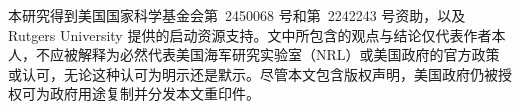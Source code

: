 
\begin{acknowledgements}
本研究得到美国国家科学基金会第~2450068 号和第~2242243 号资助，以及 Rutgers University 提供的启动资源支持。文中所包含的观点与结论仅代表作者本人，不应被解释为必然代表美国海军研究实验室（NRL）或美国政府的官方政策或认可，无论这种认可为明示还是默示。尽管本文包含版权声明，美国政府仍被授权可为政府用途复制并分发本文重印件。
\end{acknowledgements}
